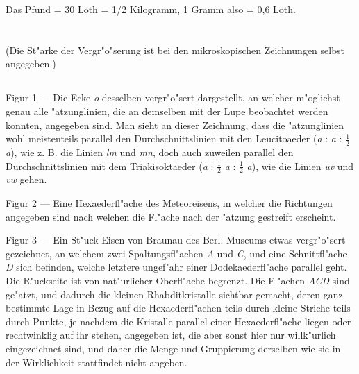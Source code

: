 \documentclass[a4paper, 11pt, oneside]{article}
\begin{document}
\begin{center}
Das Pfund = 30 Loth = 1/2 Kilogramm, 1 Gramm also = 0,6 Loth.
\end{center}
\clearpage
\section{}
\begin{center}
(Die St"arke der Vergr"o"serung ist bei den mikroskopischen Zeichnungen selbst angegeben.)
\end{center}
\subsection{}
\paragraph{}
Figur 1 --- Die Ecke \emph{o} desselben vergr"o"sert dargestellt, an welcher m"oglichst genau alle "atzunglinien, die an demselben mit der Lupe beobachtet werden konnten, angegeben sind. Man sieht an dieser Zeichnung, dass die "atzunglinien wohl meistenteils parallel den Durchschnittslinien mit den Leucitoaeder (\emph{a} : \emph{a} : $\frac{1}{2}$ \emph{a}), wie z. B. die Linien \emph{lm} und \emph{mn}, doch auch zuweilen parallel den Durchschnittslinien mit dem Triakisoktaeder (\emph{a} : $\frac{1}{2}$ \emph{a} : $\frac{1}{2}$ \emph{a}), wie die Linien \emph{uv} und \emph{vw} gehen.

Figur 2 --- Eine Hexaederfl"ache des Meteoreisens, in welcher die Richtungen angegeben sind nach welchen die Fl"ache nach der "atzung gestreift erscheint.

Figur 3 --- Ein St"uck Eisen von Braunau des Berl. Museums etwas vergr"o"sert gezeichnet, an welchem zwei Spaltungsfl"achen \emph{A} und \emph{C}, und eine Schnittfl"ache \emph{D} sich befinden, welche letztere ungef"ahr einer Dodekaederfl"ache parallel geht. Die R"uckseite ist von nat"urlicher Oberfl"ache begrenzt. Die Fl"achen \emph{ACD} sind ge"atzt, und dadurch die kleinen Rhabditkristalle sichtbar gemacht, deren ganz bestimmte Lage in Bezug auf die Hexaederfl"achen teils durch kleine Striche teils durch Punkte, je nachdem die Kristalle parallel einer Hexaederfl"ache liegen oder rechtwinklig auf ihr stehen, angegeben ist, die aber sonst hier nur willk"urlich eingezeichnet sind, und daher die Menge und Gruppierung derselben wie sie in der Wirklichkeit stattfindet nicht angeben.
\end{document}
